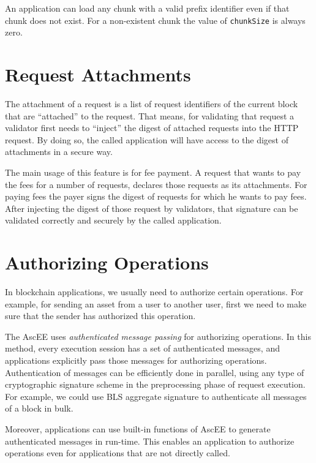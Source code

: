 An application can load any chunk with a valid prefix identifier even if that chunk does not exist. For a non-existent
chunk the value of \texttt{chunkSize} is always zero.


\section{Request Attachments}\label{sec:attachments}

The attachment of a request is a list of request identifiers of the current block that are ``attached'' to the request.
That means, for validating that request a validator first needs to ``inject'' the digest of attached requests into the
HTTP request. By doing so, the called application will have access to the digest of attachments in a secure way.

The main usage of this feature is for fee payment. A request that wants to pay the fees for a number of requests,
declares those requests as its attachments. For paying fees the payer signs the digest of requests for which he
wants to pay fees. After injecting the digest of those request by validators, that signature can be validated
correctly and securely by the called application.


\section{Authorizing Operations}\label{sec:authorizing-operations}

In blockchain applications, we usually need to authorize certain operations. For example, for sending an asset
from a user to another user, first we need to make sure that the sender has authorized this operation.

The AscEE uses \emph{authenticated message passing} for authorizing operations. In this method, every execution
session has a set of authenticated messages, and applications explicitly pass those messages for authorizing operations.
Authentication of messages can be efficiently done in parallel, using any type of cryptographic signature scheme in
the preprocessing phase of request execution. For example, we could use BLS aggregate signature to authenticate all
messages of a block in bulk.

Moreover, applications can use built-in functions of AscEE to generate authenticated messages in run-time. This enables
an application to authorize operations even for applications that are not directly called.

